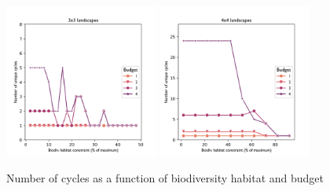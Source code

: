 \newpage
\begin{figure}[H]
    \centering
    \includegraphics[width = 0.45\textwidth]{figures/wildland/number_cycles3.png}
    \includegraphics[width = 0.45\textwidth]{figures/wildland/number_cycles4.png}
    \caption{Number of cycles as a function of biodiversity habitat and budget}
    \label{fig:distrib_cycles}
\end{figure}
\newpage
